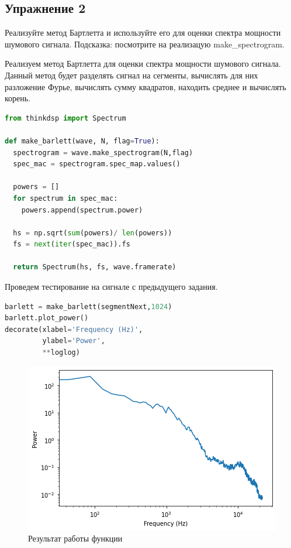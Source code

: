 \subsection{Упражнение 2}

Реализуйте метод Бартлетта\cite{barlett} и используйте его для оценки спектра мощности шумового сигнала. Подсказка: посмотрите на реализацую make\_spectrogram.

Реализуем метод Бартлетта для оценки спектра мощности шумового сигнала. Данный метод будет разделять сигнал на сегменты, вычислять для них разложение Фурье, вычислять сумму квадратов, находить среднее и вычислять корень.


\begin{lstlisting}[language=Python]
from thinkdsp import Spectrum

def make_barlett(wave, N, flag=True):
  spectrogram = wave.make_spectrogram(N,flag)
  spec_mac = spectrogram.spec_map.values()

  powers = []
  for spectrum in spec_mac:
    powers.append(spectrum.power)
  
  hs = np.sqrt(sum(powers)/ len(powers))
  fs = next(iter(spec_mac)).fs

  return Spectrum(hs, fs, wave.framerate)
\end{lstlisting}

Проведем тестирование на сигнале с предыдущего задания.

\begin{lstlisting}[language=Python]
barlett = make_barlett(segmentNext,1024)
barlett.plot_power()
decorate(xlabel='Frequency (Hz)', 
         ylabel='Power', 
         **loglog)
\end{lstlisting}

\begin{figure}[H]
	\begin{center}
		\includegraphics[scale=1]{fig/lab04/lab04_4.png}
		\caption{Результат работы функции}
	\end{center}
\end{figure}


